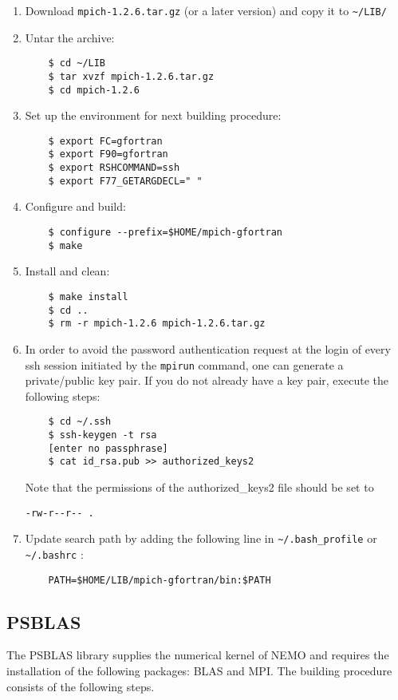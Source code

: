 \documentclass[a4paper,12pt]{article}%
\begin{document}
\begin{enumerate}
\item Download \verb+mpich-1.2.6.tar.gz+ (or a later version) and
  copy it to \verb+~/LIB/+
\item Untar the archive:
  \begin{Verbatim}
    $ cd ~/LIB
    $ tar xvzf mpich-1.2.6.tar.gz
    $ cd mpich-1.2.6
  \end{Verbatim}
\item Set up the environment for next building procedure:
  \begin{Verbatim}
    $ export FC=gfortran
    $ export F90=gfortran
    $ export RSHCOMMAND=ssh
    $ export F77_GETARGDECL=" "
  \end{Verbatim}
\item Configure and build:
  \begin{Verbatim}
    $ configure --prefix=$HOME/mpich-gfortran
    $ make
  \end{Verbatim}
\item Install and clean:
  \begin{Verbatim}
    $ make install
    $ cd ..
    $ rm -r mpich-1.2.6 mpich-1.2.6.tar.gz
  \end{Verbatim}
\item In order to avoid the password authentication request at the
  login of every ssh session initiated by the \verb+mpirun+
  command, one can generate a private/public key pair.  If you do not already
  have a key pair,
execute the following steps:
  \begin{Verbatim}
    $ cd ~/.ssh
    $ ssh-keygen -t rsa
    [enter no passphrase]
    $ cat id_rsa.pub >> authorized_keys2
  \end{Verbatim}

Note that the permissions of the authorized\_keys2 file should be set to

 \verb+-rw-r--r-- .+
\item Update search path by adding the following line in
  \verb+~/.bash_profile+ or \verb+~/.bashrc+ :
  \begin{Verbatim}
    PATH=$HOME/LIB/mpich-gfortran/bin:$PATH
  \end{Verbatim}
\end{enumerate}

\subsection{PSBLAS}

The PSBLAS library supplies the numerical kernel of NEMO and requires
the installation of the following packages: BLAS and MPI. The
building procedure consists of the following steps.
\end{document}
